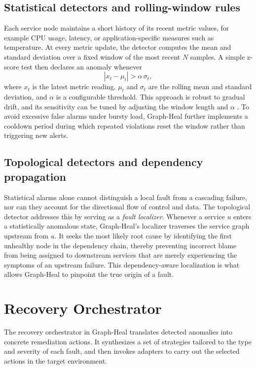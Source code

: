 \documentclass[11pt,conference]{IEEEtran}
\begin{document}
\subsection{Statistical detectors and rolling-window rules}
Each service node maintains a short history of its recent metric values, for example CPU usage, latency, or application-specific measures such as temperature.  At every metric update, the detector computes the mean and standard deviation over a fixed window of the most recent \(N\) samples.  A simple z-score test then declares an anomaly whenever
\[
  |x_t - \mu_t| > \alpha\,\sigma_t,
\]
where \(x_t\) is the latest metric reading, \(\mu_t\) and \(\sigma_t\) are the rolling mean and standard deviation, and \(\alpha\) is a configurable threshold.  This approach is robust to gradual drift, and its sensitivity can be tuned by adjusting the window length and \(\alpha\) \cite{chandola2009anomaly}.  To avoid excessive false alarms under bursty load, Graph-Heal further implements a cooldown period during which repeated violations reset the window rather than triggering new alerts.

\subsection{Topological detectors and dependency propagation}
Statistical alarms alone cannot distinguish a local fault from a cascading failure, nor can they account for the directional flow of control and data.  The topological detector addresses this by serving as a \emph{fault localizer}. Whenever a service \(u\) enters a statistically anomalous state, Graph-Heal's localizer traverses the service graph upstream from \(u\). It seeks the most likely root cause by identifying the first unhealthy node in the dependency chain, thereby preventing incorrect blame from being assigned to downstream services that are merely experiencing the symptoms of an upstream failure. This dependency-aware localization is what allows Graph-Heal to pinpoint the true origin of a fault.


\section{Recovery Orchestrator}
\label{sec:recovery-orchestrator}

The recovery orchestrator in Graph-Heal translates detected anomalies into concrete remediation actions.  It synthesizes a set of strategies tailored to the type and severity of each fault, and then invokes adapters to carry out the selected actions in the target environment.
\end{document}
